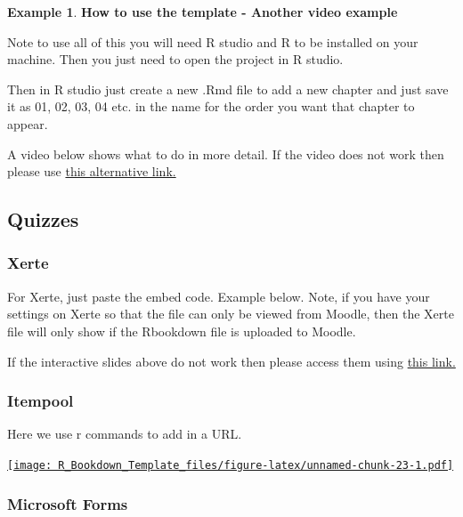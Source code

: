\documentclass[
]{article}
\numberwithin{equation}{section}
\numberwithin{figure}{section}
\theoremstyle{break}
\theoremstyle{definition}
\theoremstyle{definition}
\newtheorem{example}{Example}[section]
\theoremstyle{definition}
\theoremstyle{definition}
\theoremstyle{remark}
\begin{document}
\begin{example}

\textbf{How to use the template - Another video example}

Note to use all of this you will need R studio and R to be installed on your machine. Then you just need to open the project in R studio.

Then in R studio just create a new .Rmd file to add a new chapter and just save it as 01, 02, 03, 04 etc. in the name for the order you want that chapter to appear.

A video below shows what to do in more detail. If the video does not work then please use \href{https://mediaspace.nottingham.ac.uk/media/How+to+use+the+template/1_brjfqb44}{this alternative link.}

\end{example}

\hypertarget{quizzes}{%
\subsection{Quizzes}\label{quizzes}}

\hypertarget{xerte}{%
\subsubsection{Xerte}\label{xerte}}

For Xerte, just paste the embed code. Example below. Note, if you have your settings on Xerte so that the file can only be viewed from Moodle, then the Xerte file will only show if the Rbookdown file is uploaded to Moodle.

If the interactive slides above do not work then please access them using \href{https://www.nottingham.ac.uk/toolkits/play_25775}{this link.}

\hypertarget{itempool}{%
\subsubsection{Itempool}\label{itempool}}

Here we use r commands to add in a URL.

\href{https://itempool.com/lisamott/c/4GwLabABphe}{\texttt{[image: R\_Bookdown\_Template\_files/figure-latex/unnamed-chunk-23-1.pdf]}}

\hypertarget{microsoft-forms}{%
\subsubsection{Microsoft Forms}\label{microsoft-forms}}
\end{document}
